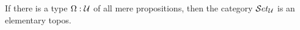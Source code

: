\documentclass[hott-all.tex]{subfiles}
\begin{document}
% 
% 
% 
\begin{thm}
  If there is a type $\Omega:\mathcal{U}$ of all mere propositions, then the category $\mathcal{S}et_\mathcal{U}$ is an elementary topos.
\end{thm}
% 
% 
% 
\end{document}
